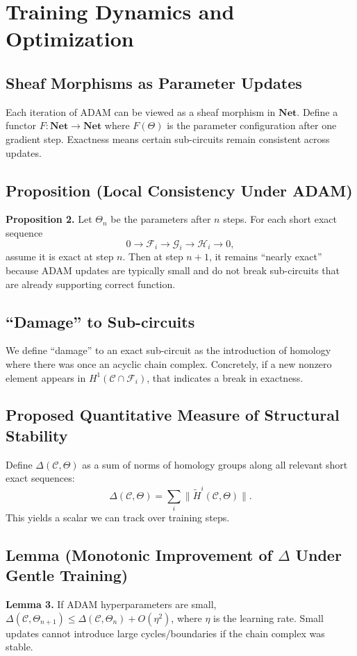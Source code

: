 \documentclass{article}
\begin{document}
\section{Training Dynamics and Optimization}

\subsection{Sheaf Morphisms as Parameter Updates}
Each iteration of ADAM can be viewed as a sheaf morphism in $\mathbf{Net}$. Define a functor $F : \mathbf{Net} \to \mathbf{Net}$ where $F(\Theta)$ is the parameter configuration after one gradient step. Exactness means certain sub-circuits remain consistent across updates.

\subsection{Proposition (Local Consistency Under ADAM)}
\textbf{Proposition 2.}  
Let $\Theta_{n}$ be the parameters after $n$ steps. For each short exact sequence 
\[
0 \to \mathcal{F}_i \to \mathcal{G}_i \to \mathcal{H}_i \to 0,
\]
assume it is exact at step $n$. Then at step $n+1$, it remains “nearly exact” because ADAM updates are typically small and do not break sub-circuits that are already supporting correct function.

\subsection{“Damage” to Sub-circuits}
We define “damage” to an exact sub-circuit as the introduction of homology where there was once an acyclic chain complex. Concretely, if a new nonzero element appears in $H^1(\mathcal{C}\cap \mathcal{F}_i)$, that indicates a break in exactness.

\subsection{Proposed Quantitative Measure of Structural Stability}
Define $\Delta(\mathcal{C}, \Theta)$ as a sum of norms of homology groups along all relevant short exact sequences:
\[
\Delta(\mathcal{C}, \Theta) = \sum_{i} \bigl\|\widetilde{H}^i(\mathcal{C}, \Theta)\bigr\|.
\]
This yields a scalar we can track over training steps.

\subsection{Lemma (Monotonic Improvement of $\Delta$ Under Gentle Training)}
\textbf{Lemma 3.}  
If ADAM hyperparameters are small, $\Delta(\mathcal{C}, \Theta_{n+1}) \le \Delta(\mathcal{C}, \Theta_{n}) + O(\eta^2)$, where $\eta$ is the learning rate. Small updates cannot introduce large cycles/boundaries if the chain complex was stable.
\end{document}
